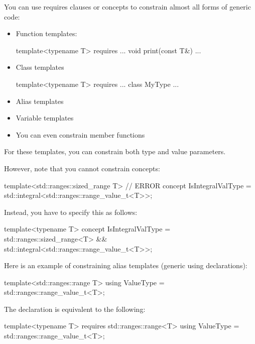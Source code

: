 

You can use requires clauses or concepts to constrain almost all forms of generic code:

\begin{itemize}
\item
Function templates:
\begin{cpp}
template<typename T>
requires ...
void print(const T&) {
	...
}
\end{cpp}

\item
Class templates
\begin{cpp}
template<typename T>
requires ...
class MyType {
	...
}
\end{cpp}

\item
Alias templates

\item
Variable templates

\item
You can even constrain member functions
\end{itemize}

For these templates, you can constrain both type and value parameters.

However, note that you cannot constrain concepts:

\begin{cpp}
template<std::ranges::sized_range T> // ERROR
concept IsIntegralValType = std::integral<std::ranges::range_value_t<T>>;
\end{cpp}

Instead, you have to specify this as follows:

\begin{cpp}
template<typename T>
concept IsIntegralValType = std::ranges::sized_range<T> &&
							std::integral<std::ranges::range_value_t<T>>;
\end{cpp}



Here is an example of constraining alias templates (generic using declarations):

\begin{cpp}
template<std::ranges::range T>
using ValueType = std::ranges::range_value_t<T>;
\end{cpp}

The declaration is equivalent to the following:

\begin{cpp}
template<typename T>
requires std::ranges::range<T>
using ValueType = std::ranges::range_value_t<T>;
\end{cpp}

